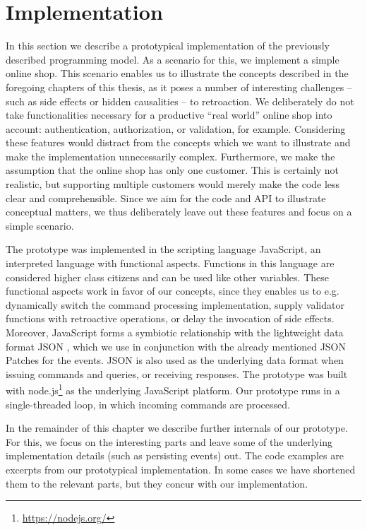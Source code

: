 \section{Implementation}
\label{sec:implementation}

In this section we describe a prototypical implementation of the previously
described programming model. As a scenario for this, we implement a simple 
online shop.
This scenario enables us to illustrate the concepts described in the foregoing 
chapters of this thesis, as it poses a number of interesting challenges -- such 
as side effects or hidden causalities -- to retroaction.
%
We deliberately do not take functionalities necessary for a productive ``real
world'' online shop into account: authentication, authorization, or validation, 
for example. Considering these features would distract from the concepts which 
we want to illustrate and make the implementation unnecessarily complex. 
Furthermore, we make the assumption that the online shop has only one customer.
This is certainly not realistic, but supporting multiple customers would
merely make the code less clear and comprehensible.
Since we aim for the code and API to illustrate conceptual matters, we thus
deliberately leave out these features and focus on a simple scenario.
%

The prototype was implemented in the scripting language JavaScript, an 
interpreted language with functional aspects. Functions in this language are 
considered higher class citizens and can be used like other variables.
These functional aspects work in favor of our concepts, since they enables us
to e.g. dynamically switch the command processing implementation, supply 
validator functions with retroactive operations, or delay the invocation of 
side effects.
Moreover, JavaScript forms a symbiotic relationship with the lightweight data
format JSON \cite{RFC7159}, which we use in conjunction with the already 
mentioned JSON Patches for the events. 
JSON is also used as the underlying data format when issuing commands and 
queries, or receiving responses.
The prototype was built with node.js\footnote[2]{\href{https://nodejs.org/}{https://nodejs.org/}} 
as the underlying JavaScript platform. Our prototype runs in a single-threaded 
loop, in which incoming commands are processed. 

In the remainder of this chapter we describe further internals of our prototype. 
For this, we focus on the interesting parts and leave some of the underlying 
implementation details (such as persisting events) out.
The code examples are excerpts from our prototypical implementation. In some 
cases we have shortened them to the relevant parts, but they concur with our 
implementation.

